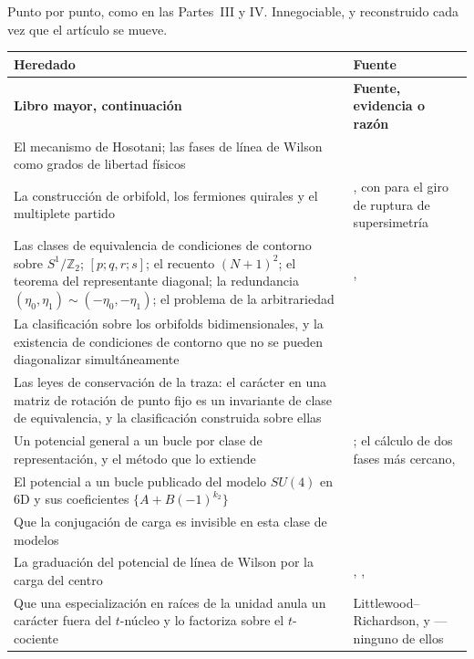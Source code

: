 \documentclass[11pt,a4paper]{article}
\newcommand{\ZZ}{\mathbb{Z}}
\newcommand{\su}[1]{SU(#1)}
\begin{document}
Punto por punto, como en las Partes~III y IV. Innegociable, y reconstruido cada vez que el artículo
se mueve.

\begingroup\small
\renewcommand{\arraystretch}{0.94}  %
\setlength{\LTpre}{4pt}\setlength{\LTpost}{4pt}
\begin{longtable}{p{7.1cm} p{8.1cm}}
\toprule
\rowcolor{hdrblue!14}\textbf{Heredado} & \textbf{Fuente}\\
\midrule
\endfirsthead
\toprule
\rowcolor{hdrblue!14}\textbf{Libro mayor, continuación} & \textbf{Fuente, evidencia o razón}\\
\midrule
\endhead
El mecanismo de Hosotani; las fases de línea de Wilson como grados de libertad físicos &
\cite{Hosotani}\\
La construcción de orbifold, los fermiones quirales y el multiplete partido &
\cite{Kawamura,HallNomura}, con \cite{SS} para el giro de ruptura de supersimetría\\
Las clases de equivalencia de condiciones de contorno sobre $S^1/\ZZ_2$; $[p;q,r;s]$; el recuento
$(N+1)^2$; el teorema del representante diagonal; la redundancia
$(\eta_0,\eta_1)\sim(-\eta_0,-\eta_1)$; el problema de la arbitrariedad & \cite{HHK},
\cite{HosotaniArb}\\
La clasificación sobre los orbifolds bidimensionales, y la existencia de condiciones de contorno que
no se pueden diagonalizar simultáneamente & \cite{KM}\\
Las leyes de conservación de la traza: el carácter en una matriz de rotación de punto fijo es un
invariante de clase de equivalencia, y la clasificación construida sobre ellas & \cite{TI1,TI2}\\
Un potencial general a un bucle por clase de representación, y el método que lo extiende & \cite{HY};
el cálculo de dos fases más cercano, \cite{HHHK}\\
El potencial a un bucle publicado del modelo $\su4$ en 6D y sus coeficientes $\{A+B(-1)^{k_2}\}$ &
\cite{AHMN}\\
Que la conjugación de carga es invisible en esta clase de modelos & \cite{KKKY}\\
La graduación del potencial de línea de Wilson por la carga del centro & \cite{DM}, \cite{RW},
\cite{ArgyresUnsal,Ogilvie}\\
Que una especialización en raíces de la unidad anula un carácter fuera del $t$-núcleo y lo factoriza
sobre el $t$-cociente & Littlewood--Richardson, y \cite{Lecouvey,AK,Albion} --- ninguno de ellos

\end{longtable}
\end{document}
